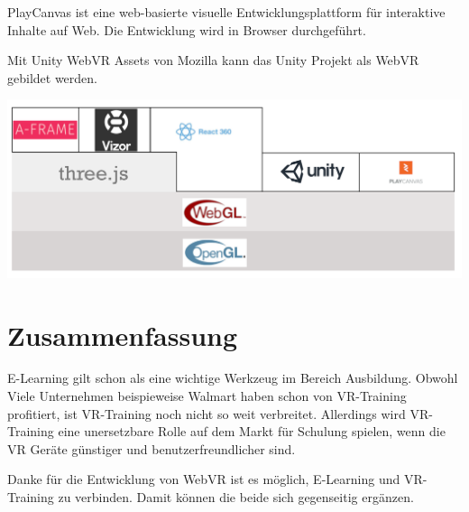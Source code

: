  PlayCanvas ist eine web-basierte visuelle Entwicklungsplattform für interaktive Inhalte auf Web. Die Entwicklung wird in Browser durchgeführt.
 
 Mit Unity WebVR Assets von Mozilla kann das Unity Projekt als WebVR gebildet werden.

\includegraphics[width=\textwidth]{images/webVRStruckture.png}

\section{Zusammenfassung}
E-Learning gilt schon als eine wichtige Werkzeug im Bereich Ausbildung. Obwohl Viele Unternehmen beispieweise Walmart\citep{24} haben schon von VR-Training profitiert, ist VR-Training noch nicht so weit verbreitet. Allerdings wird VR-Training eine unersetzbare Rolle auf dem Markt für Schulung spielen, wenn die VR Geräte günstiger und benutzerfreundlicher sind.

Danke für die Entwicklung von WebVR ist es möglich, E-Learning und VR-Training zu verbinden. Damit können die beide sich gegenseitig ergänzen.


